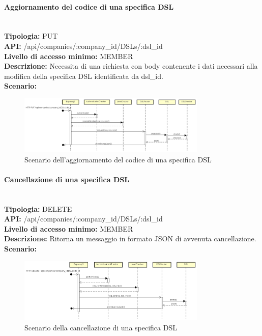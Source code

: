 \newpage
\paragraph{Aggiornamento del codice di una specifica DSL}\mbox{}\\
\textbf{Tipologia:} PUT \\
\textbf{API:} /api/companies/:company\_id/DSLs/:dsl\_id \\
\textbf{Livello di accesso minimo:} MEMBER \\
\textbf{Descrizione:} Necessita di una richiesta con body contenente i dati necessari alla modifica della specifica DSL identificata da dsl\_id. \\
\textbf{Scenario:}
\begin{figure}[H]
\centering
\includegraphics[width=0.8\textwidth]{res/sections/backend/sequence/(PUT)dsl.png}
\caption{Scenario dell'aggiornamento del codice di una specifica DSL}
\end{figure}

\newpage
\paragraph{Cancellazione di una specifica DSL}\mbox{}\\
\textbf{Tipologia:} DELETE \\
\textbf{API:} /api/companies/:company\_id/DSLs/:dsl\_id \\
\textbf{Livello di accesso minimo:} MEMBER \\
\textbf{Descrizione:} Ritorna un messaggio in formato JSON di avvenuta cancellazione. \\
\textbf{Scenario:} 
\begin{figure}[H]
\centering
\includegraphics[width=0.8\textwidth]{res/sections/backend/sequence/(DELETE)dsl.png}
\caption{Scenario della cancellazione di una specifica DSL}
\end{figure}

